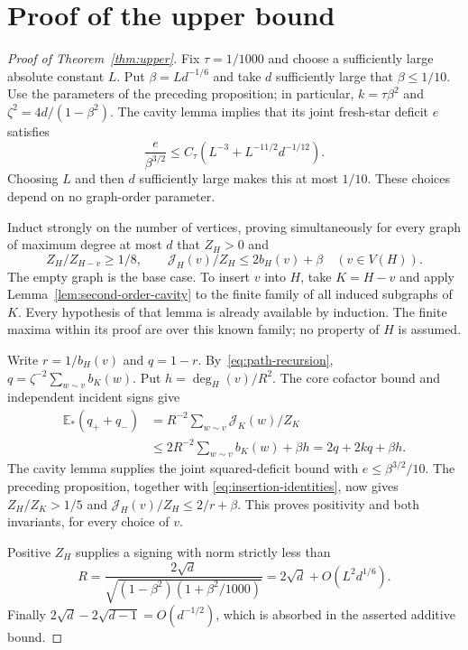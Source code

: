 \documentclass[11pt]{article}
\numberwithin{equation}{section}
\newcommand{\E}{\mathbb E}
\begin{document}
\section{Proof of the upper bound}
\begin{proof}[Proof of Theorem~\ref{thm:upper}]
Fix $\tau=1/1000$ and choose a sufficiently large absolute constant
$L$. Put $\beta=Ld^{-1/6}$ and take $d$ sufficiently large that
$\beta\le1/10$. Use the parameters of the preceding proposition;
in particular, $k=\tau\beta^2$ and $\zeta^2=4d/(1-\beta^2)$.
The cavity lemma implies that its joint fresh-star deficit $e$
satisfies
\[
 \frac e{\beta^{3/2}}
 \le C_\tau\left(L^{-3}+L^{-11/2}d^{-1/12}\right).
\]
Choosing $L$ and then $d$ sufficiently large makes this at most
$1/10$. These choices depend on no graph-order parameter.

Induct strongly on the number of vertices, proving simultaneously
for every graph of maximum degree at most $d$ that $Z_H>0$ and
\[
 Z_H/Z_{H-v}\ge1/8,
 \qquad \mathcal J_H(v)/Z_H\le2b_H(v)+\beta
 \quad(v\in V(H)).
\]
The empty graph is the base case. To insert $v$ into $H$, take
$K=H-v$ and apply Lemma~\ref{lem:second-order-cavity} to the finite
family of all induced subgraphs of $K$. Every hypothesis of that
lemma is already available by induction. The finite maxima within
its proof are over this known family; no property of $H$ is assumed.

Write $r=1/b_H(v)$ and $q=1-r$. By~\eqref{eq:path-recursion},
$q=\zeta^{-2}\sum_{w\sim v}b_K(w)$. Put $h=\deg_H(v)/R^2$.
The core cofactor bound and independent incident signs give
\begin{align*}
 \E_*(q_++q_-)
 &=R^{-2}\sum_{w\sim v}\mathcal J_K(w)/Z_K\\
 &\le2R^{-2}\sum_{w\sim v}b_K(w)+\beta h
   =2q+2kq+\beta h.
\end{align*}
The cavity lemma supplies the joint squared-deficit bound with
$e\le\beta^{3/2}/10$. The preceding proposition, together with
\eqref{eq:insertion-identities}, now gives $Z_H/Z_K>1/5$ and
$\mathcal J_H(v)/Z_H\le2/r+\beta$. This proves positivity and both
invariants, for every choice of $v$.

Positive $Z_H$ supplies a signing with norm strictly less than
\[
 R=\frac{2\sqrt d}{\sqrt{(1-\beta^2)(1+\beta^2/1000)}}
   =2\sqrt d+O(L^2d^{1/6}).
\]
Finally $2\sqrt d-2\sqrt{d-1}=O(d^{-1/2})$, which is absorbed in
the asserted additive bound.
\end{proof}
\end{document}
